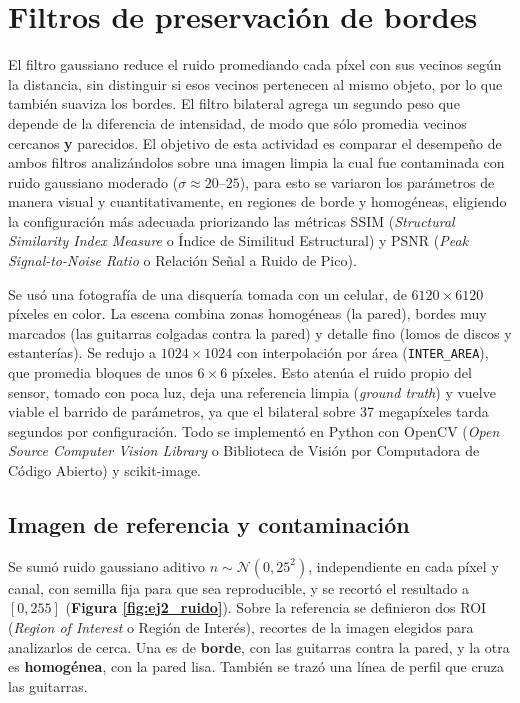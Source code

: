 \section{Filtros de preservación de bordes}

    El filtro gaussiano reduce el ruido promediando cada píxel con sus vecinos según la distancia, sin distinguir si esos vecinos pertenecen al mismo objeto, por lo que también suaviza los bordes. El filtro bilateral agrega un segundo peso que depende de la diferencia de intensidad, de modo que sólo promedia vecinos cercanos \textbf{y} parecidos. El objetivo de esta actividad es comparar el desempeño de ambos filtros analizándolos sobre una imagen limpia la cual fue contaminada con ruido gaussiano moderado ($\sigma \approx 20$--$25$), para esto se variaron los parámetros de manera visual y cuantitativamente, en regiones de borde y  homogéneas, eligiendo la configuración más adecuada priorizando las métricas SSIM (\textit{Structural Similarity Index Measure} o Índice de Similitud Estructural) y PSNR (\textit{Peak Signal-to-Noise Ratio} o Relación Señal a Ruido de Pico).

    Se usó una fotografía de una disquería tomada con un celular, de $6120\times6120$ píxeles en color. La escena combina zonas homogéneas (la pared), bordes muy marcados (las guitarras colgadas contra la pared) y detalle fino (lomos de discos y estanterías). Se redujo a $1024\times1024$ con interpolación por área (\texttt{INTER\_AREA}), que promedia bloques de unos $6\times6$ píxeles. Esto atenúa el ruido propio del sensor, tomado con poca luz, deja una referencia limpia (\textit{ground truth}) y vuelve viable el barrido de parámetros, ya que el bilateral sobre 37 megapíxeles tarda segundos por configuración. Todo se implementó en Python con OpenCV (\textit{Open Source Computer Vision Library} o Biblioteca de Visión por Computadora de Código Abierto) y scikit-image.

    \subsection{Imagen de referencia y contaminación}

        Se sumó ruido gaussiano aditivo $n \sim \mathcal{N}(0, 25^2)$, independiente en cada píxel y canal, con semilla fija para que sea reproducible, y se recortó el resultado a $[0, 255]$ (\textbf{Figura \ref{fig:ej2_ruido}}). Sobre la referencia se definieron dos ROI (\textit{Region of Interest} o Región de Interés), recortes de la imagen elegidos para analizarlos de cerca. Una es de \textbf{borde}, con las guitarras contra la pared, y la otra es \textbf{homogénea}, con la pared lisa. También se trazó una línea de perfil que cruza las guitarras.

